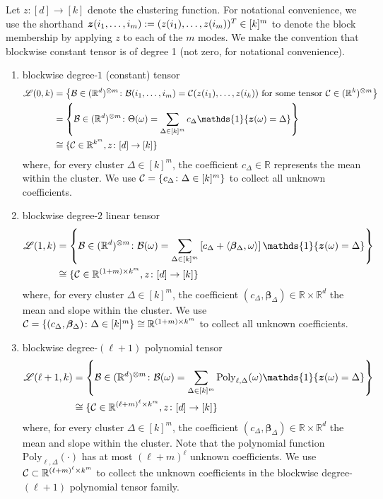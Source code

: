\documentclass[final,12pt]{colt2020} %
\def\tL{\large\mathscr{L}}
\begin{document}
\newpage
Let $z\colon[d]\to[k]$ denote the clustering function. For notational convenience, we use the shorthand $\bm{z}(i_1,\ldots,i_m):=(z(i_1),\ldots,z(i_m))^T\in[k]^m$ to denote the block membership by applying $z$ to each of the $m$ modes. We make the convention that blockwise constant tensor is of degree 1 (not zero, for notational convenience).  
\begin{enumerate}
\item blockwise degree-$1$ (constant) tensor
\begin{align}
\tL(0,k)&=\left\{\tB\in(\mathbb{R}^{d})^{\otimes m}\colon \tB(i_1,\ldots,i_m)=\tC(z(i_1),\ldots,z(i_k)) \text{ for some tensor $\tC\in(\mathbb{R}^k)^{\otimes m}$}\right\}\\
&=\left\{\tB\in(\mathbb{R}^{d})^{\otimes m}\colon \Theta(\omega)= \sum_{\Delta \in[k]^m}c_{\Delta}\mathds{1}\{\mz(\omega)=\Delta\} \right\}\\
&\cong \{\tC \in\mathbb{R}^{k^m}, z\colon[d]\to[k]\}
\end{align}
where, for every cluster $\Delta\in[k]^m$, the coefficient $c_{\Delta}\in\mathbb{R}$ represents the mean within the cluster. We use $\mathcal{C}=\{c_{\Delta}\colon \Delta\in[k]^m\}$ to collect all unknown coefficients. 

\item blockwise degree-$2$ linear tensor
\begin{align}
\tL(1,k)&=\left\{\tB\in(\mathbb{R}^{d})^{\otimes m}\colon \tB(\omega)=\sum_{\Delta \in [k]^m} \left[c_{\Delta}+\langle \boldsymbol{\beta}_{\Delta}, \omega\rangle\right] \mathds{1}\{\mz(\omega)=\Delta \}\right\}\\
&\cong\{\tC\in\mathbb{R}^{(1+m) \times k^m}, z\colon[d]\to[k]\}
\end{align}
where, for every cluster $\Delta\in[k]^m$, the coefficient $(c_{\Delta}, \boldsymbol{\beta}_{\Delta}) \in \mathbb{R}\times \mathbb{R}^d$ the mean and slope within the cluster. We use $\mathcal{C}=\{(c_{\Delta}, \boldsymbol{\beta}_{\Delta})\colon \Delta\in[k]^m\}\cong\mathbb{R}^{(1+m)\times k^m}$ to collect all unknown coefficients. 


\item blockwise degree-$(\ell+1)$ polynomial tensor
\begin{align}
\tL(\ell+1,k)&=\left\{\tB\in(\mathbb{R}^{d})^{\otimes m}\colon \tB(\omega)=\sum_{\Delta \in [k]^m} \text{Poly}_{\ell,\Delta}(\omega) \mathds{1}\{\mz(\omega)=\Delta \}\right\}\\
&\cong\{\tC\in\mathbb{R}^{(\ell+m)^\ell\times k^m}, z\colon[d]\to[k] \}
\end{align}
where, for every cluster $\Delta\in[k]^m$, the coefficient $(c_{\Delta}, \boldsymbol{\beta}_{\Delta}) \in \mathbb{R}\times \mathbb{R}^d$ the mean and slope within the cluster. Note that the polynomial function $\text{Poly}_{\ell,\Delta}(\cdot)$ has at most $(\ell+m)^{\ell}$ unknown coefficients. We use $\mathcal{C} \subset \mathbb{R}^{(\ell+m)^\ell \times k^m}$ to collect the unknown coefficients in the blockwise degree-$(\ell+1)$ polynomial tensor family. 


\end{enumerate}
\end{document}

